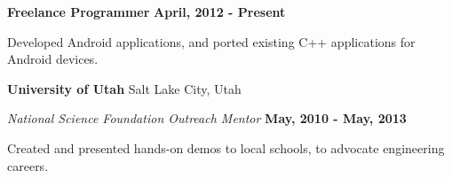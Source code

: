 {\bf Freelance Programmer} \hfill{\bf April, 2012 - Present}

\begin{list1}
\item[] Developed Android applications, and ported existing C++ applications for Android devices.
\end{list1}


{\bf University of Utah} \hfill{ Salt Lake City, Utah}

\vspace*{-.05in}
{\em National Science Foundation Outreach Mentor} \hfill {\bf May, 2010 - May, 2013}

\begin{list1}
\item[] Created and presented hands-on demos to local schools, to advocate engineering careers.
\end{list1}





% 
% 
% 
% 
% 
% 